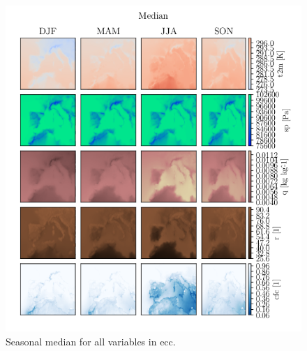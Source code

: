 \begin{figure}[ht]
    \centering
    \includegraphics{python_figs/seasonal_median_all_variables.png}
    \caption{Seasonal median for all variables in \acrshort{ecc}.}
    \label{fig:seasonal_median}
\end{figure}


\cleardoublepage
